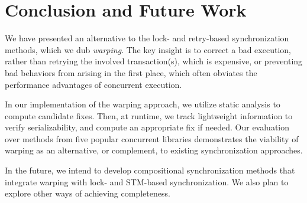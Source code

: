 \section{Conclusion and Future Work}

We have presented an alternative to the lock- and retry-based synchronization methods, which we dub \emph{warping}. The key insight is to correct a bad execution, rather than retrying the involved transaction(s), which is expensive, or preventing bad behaviors from arising in the first place, which often obviates the performance advantages of concurrent execution.

In our implementation of the warping approach, we utilize static analysis to compute candidate fixes. Then, at runtime, we track lightweight information to verify serializability, and compute an appropriate fix if needed. Our evaluation over methods from five popular concurrent libraries demonstrates the viability of warping as an alternative, or complement, to existing synchronization approaches. 

In the future, we intend to develop compositional synchronization methods that integrate warping with lock- and STM-based synchronization. We also plan to explore other ways of achieving completeness. 